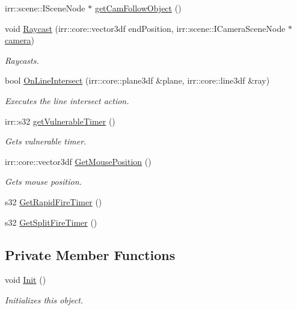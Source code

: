 \begin{DoxyCompactItemize}
irr\-::scene\-::\-I\-Scene\-Node $\ast$ \hyperlink{class_player_ad41c9997bb4efcb41d8a82bf5b14c019}{get\-Cam\-Follow\-Object} ()
\item 
void \hyperlink{class_player_a1b4fa88c5aebe9ada71cae33ec3f43eb}{Raycast} (irr\-::core\-::vector3df end\-Position, irr\-::scene\-::\-I\-Camera\-Scene\-Node $\ast$\hyperlink{_game_8cpp_af95833c961e5bd20dcd54e1d46a03c0b}{camera})
\begin{DoxyCompactList}\small\item\em Raycasts. \end{DoxyCompactList}\item 
bool \hyperlink{class_player_ae6123d6c74c9b5110971267f3cd52b08}{On\-Line\-Intersect} (irr\-::core\-::plane3df \&plane, irr\-::core\-::line3df \&ray)
\begin{DoxyCompactList}\small\item\em Executes the line intersect action. \end{DoxyCompactList}\item 
irr\-::s32 \hyperlink{class_player_ae790e9e2f8a4f53c11423d25410b5fdf}{get\-Vulnerable\-Timer} ()
\begin{DoxyCompactList}\small\item\em Gets vulnerable timer. \end{DoxyCompactList}\item 
irr\-::core\-::vector3df \hyperlink{class_player_a1a5ffa93ed21193d12261a46fd1613a1}{Get\-Mouse\-Position} ()
\begin{DoxyCompactList}\small\item\em Gets mouse position. \end{DoxyCompactList}\item 
s32 \hyperlink{class_player_ad81495e13d7c65f0ea090a9144e11d61}{Get\-Rapid\-Fire\-Timer} ()
\item 
s32 \hyperlink{class_player_a6b5c6e5353331ab55bfd440ea9f8f9bf}{Get\-Split\-Fire\-Timer} ()
\end{DoxyCompactItemize}
\subsection*{Private Member Functions}
\begin{DoxyCompactItemize}
\item 
void \hyperlink{class_player_a4523bf2e637fcb0e36a3f456ec397e7d}{Init} ()
\begin{DoxyCompactList}\small\item\em Initializes this object. \end{DoxyCompactList}\end{DoxyCompactItemize}
